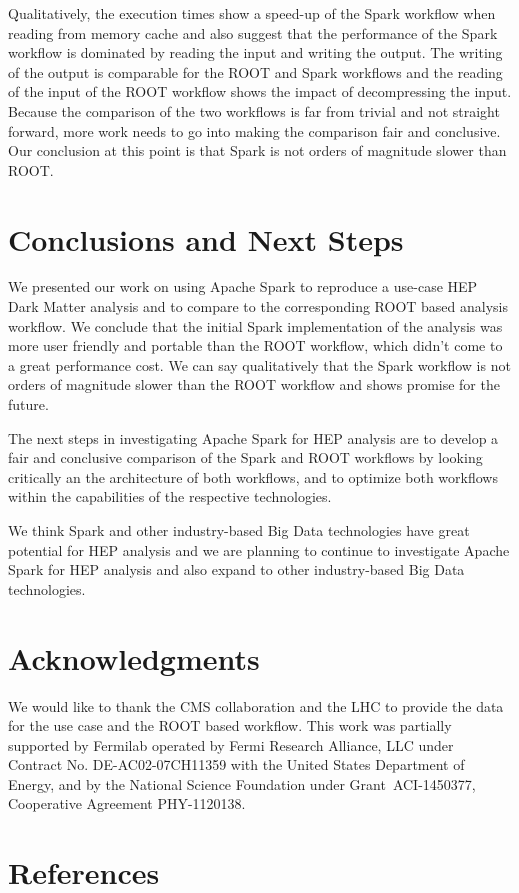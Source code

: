 \documentclass[a4paper]{jpconf}
\begin{document}
Qualitatively, the execution times show a speed-up of the Spark workflow when reading from memory cache and also suggest that the performance of the Spark workflow is dominated by reading the input and writing the output. The writing of the output is comparable for the ROOT and Spark workflows and the reading of the input of the ROOT workflow shows the impact of decompressing the input. Because the comparison of the two workflows is far from trivial and not straight forward, more work needs to go into making the comparison fair and conclusive. Our conclusion at this point is that Spark is not orders of magnitude slower than ROOT.

\section{Conclusions and Next Steps}

We presented our work on using Apache Spark to reproduce a use-case HEP Dark Matter analysis and to compare to the corresponding ROOT based analysis workflow. We conclude that the initial Spark implementation of the analysis was more user friendly and portable than the ROOT workflow, which didn't come to a great performance cost. We can say qualitatively that the Spark workflow is not orders of magnitude slower than the ROOT workflow and shows promise for the future.

The next steps in investigating Apache Spark for HEP analysis are to develop a fair and conclusive comparison of the Spark and ROOT workflows by looking critically an the architecture of both workflows, and to optimize both workflows within the capabilities of the respective technologies.

We think Spark and other industry-based Big Data technologies have great potential for HEP analysis and we are planning to continue to investigate Apache Spark for HEP analysis and also expand to other industry-based Big Data technologies.

\section{Acknowledgments}

We would like to thank the CMS collaboration and the LHC to provide the data for the use case and the ROOT based workflow. This work was partially supported by Fermilab operated by Fermi Research Alliance, LLC under Contract No. DE-AC02-07CH11359 with the United States Department of Energy, and by the National Science Foundation under Grant~ACI-1450377, Cooperative Agreement PHY-1120138.

\section*{References}

\end{document}

